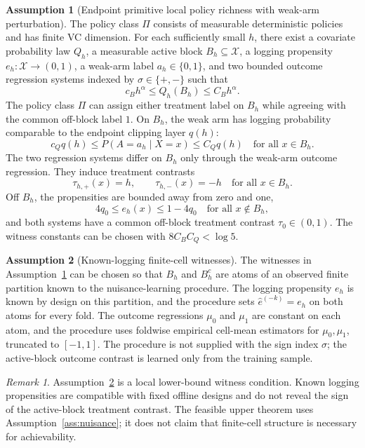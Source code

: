 \documentclass[11pt]{article}
\theoremstyle{definition}
\newtheorem{assumption}{Assumption}
\theoremstyle{plain}
\theoremstyle{remark}
\newtheorem{remark}{Remark}
\begin{document}
\begin{assumption}[Endpoint primitive local policy richness with weak-arm perturbation]\label{ass:primitive-cube}
The policy class \(\Pi\) consists of measurable deterministic policies and has
finite VC dimension.  For each sufficiently small \(h\), there exist a
covariate probability law \(Q_h\), a measurable active block
\(B_h\subseteq\mathcal X\), a logging propensity
\(e_h:\mathcal X\to(0,1)\), a weak-arm label
\(a_h\in\{0,1\}\), and two bounded outcome regression systems indexed by
\(\sigma\in\{+,-\}\) such that
\[
c_B h^\alpha\le Q_h(B_h)\le C_B h^\alpha.
\]
The policy class \(\Pi\) can assign either treatment label on \(B_h\) while
agreeing with the common off-block label \(1\).  On \(B_h\), the weak arm has
logging probability comparable to the endpoint clipping layer \(q(h)\):
\[
c_Qq(h)\le
P(A=a_h\mid X=x)
\le C_Qq(h)
\quad\text{for all }x\in B_h.
\]
The two regression systems differ on \(B_h\) only through the weak-arm
outcome regression.  They induce treatment contrasts
\[
\tau_{h,+}(x)=h,\qquad \tau_{h,-}(x)=-h
\quad\text{for all }x\in B_h.
\]
Off \(B_h\), the propensities are bounded away from zero and one,
\[
4q_0\le e_h(x)\le 1-4q_0
\quad\text{for all }x\notin B_h,
\]
and both systems have a common off-block treatment contrast
\(\tau_0\in(0,1)\).  The witness constants can be chosen with
\(8C_BC_Q<\log 5\).
\end{assumption}

\begin{assumption}[Known-logging finite-cell witnesses]\label{ass:learnable-cube}
The witnesses in Assumption~\ref{ass:primitive-cube} can be chosen so that
\(B_h\) and \(B_h^c\) are atoms of an observed finite partition known to the
nuisance-learning procedure.  The logging propensity \(e_h\) is known by
design on this partition, and the procedure sets
\(\widehat e^{(-k)}=e_h\) on both atoms for every fold.  The outcome
regressions \(\mu_0\) and \(\mu_1\) are constant on each atom, and the
procedure uses foldwise empirical cell-mean estimators for
\(\mu_0,\mu_1\), truncated to \([-1,1]\).  The procedure is not supplied with
the sign index \(\sigma\); the active-block outcome contrast is learned only
from the training sample.
\end{assumption}

\begin{remark}
Assumption~\ref{ass:learnable-cube} is a local lower-bound witness condition.
Known logging propensities are compatible with fixed offline designs and do
not reveal the sign of the active-block treatment contrast.  The feasible
upper theorem uses Assumption~\ref{ass:nuisance}; it does not claim that
finite-cell structure is necessary for achievability.
\end{remark}
\end{document}
